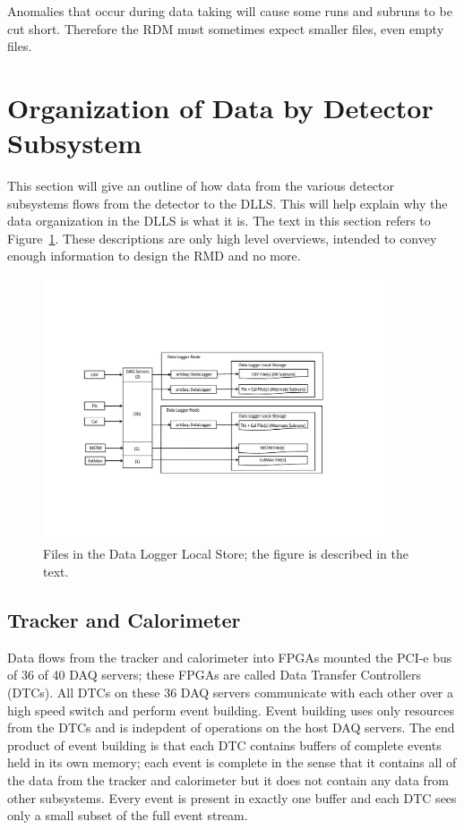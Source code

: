 Anomalies that occur during data taking will cause some runs
and subruns to be cut short.  Therefore the RDM must sometimes
expect smaller files, even empty files.


\section{Organization of Data by Detector Subsystem }
\label{ssec:dataOrganization}

This section will give an outline of how data from the
various detector subsystems flows from the detector to the DLLS.
This will help explain why the data organization in the DLLS is what it is.
The text in this section refers to Figure~\ref{fig:filesDLLS}.
These descriptions are only high level overviews,
intended to convey enough information to design the RMD and no more.


\begin{figure}[tbp]
\centering
\includegraphics[width=0.9\textwidth]{figures/FilesInDLLS.pdf}
\caption[Files in the DLLS]{
  Files in the Data Logger Local Store; the figure is described in the text.}
\label{fig:filesDLLS}
\end{figure}


\subsection{Tracker and Calorimeter}
\label{ssec:TrkAndCal}

Data flows from the tracker and calorimeter into FPGAs mounted the PCI-e bus of 36 of 40 DAQ servers;
these FPGAs are called Data Transfer Controllers (DTCs).
All DTCs on these 36 DAQ servers communicate with each other over a high speed switch
and perform event building.
Event building uses only resources from the DTCs and is indepdent of operations on the host DAQ servers.
The end product of event building is that each DTC contains buffers of complete events held in its own memory;
each event is complete in the sense that it contains all of the data from the tracker and calorimeter
but it does not contain any data from other subsystems.
Every event is present in exactly one buffer and each DTC sees only a small subset of the full event stream.

